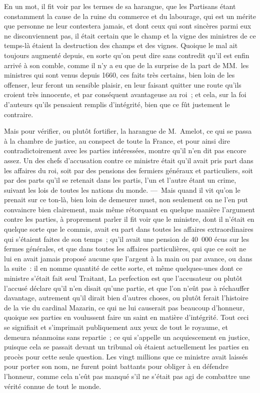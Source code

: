 \documentclass[french,twoside]{book} %
\begin{document}
En un mot, il fit voir par les termes de sa harangue, que les Partisans étant constamment la cause de la ruine du commerce et du labourage, qui est un mérite que personne ne leur contestera jamais, et dont ceux qui sont sincères parmi eux ne disconviennent pas, il était certain que le champ et la vigne des ministres de ce temps-là étaient la destruction des champs et des vignes. Quoique le mal ait toujours augmenté depuis, en sorte qu’on peut dire sans contredit qu’il est enfin arrivé à son comble, comme il n’y a eu que de la surprise de la part de MM. les ministres qui sont venus depuis 1660, ces faits très certains, bien loin de les offenser, leur feront un sensible plaisir, en leur faisant quitter une route qu’ils croient très innocente, et par conséquent avantageuse au roi ; et cela, sur la foi d’auteurs qu’ils pensaient remplis d’intégrité, bien que ce fût justement le contraire.\par
Mais pour vérifier, ou plutôt fortifier, la harangue de M. Amelot, ce qui se passa à la chambre de justice, au conspect de toute la France, et pour ainsi dire contradictoirement avec les parties intéressées, montre qu’il n’en dit pas encore assez. Un des chefs d’accusation contre ce ministre était qu’il avait pris part dans les affaires du roi, soit par des pensions des fermiers généraux et particuliers, soit par des parts qu’il se retenait dans les partis, l’un et l’autre étant un crime, suivant les lois de toutes les nations du monde. — Mais quand il vit qu’on le prenait sur ce ton-là, bien loin de demeurer muet, non seulement on ne l’en put convaincre bien clairement, mais même rétorquant en quelque manière l’argument contre les parties, à proprement parler il fit voir que le ministre, dont il n’était en quelque sorte que le commis, avait eu part dans toutes les affaires extraordinaires qui s’étaient faites de son temps ; qu’il avait une pension de 40 000 écus sur les fermes générales, et que dans toutes les affaires particulières, qui que ce soit ne lui en avait jamais proposé aucune que l’argent à la main ou par avance, ou dans la suite : il en nomme quantité de cette sorte, et même quelques-unes dont ce ministre s’était fait seul Traitant, La perfection est que l’accusateur ou plutôt l’accusé déclare qu’il n’en disait qu’une partie, et que l’on n’eût pas à réchauffer davantage, autrement qu’il dirait bien d’autres choses, ou plutôt ferait l’histoire de la vie du cardinal Mazarin, ce qui ne lui causerait pas beaucoup d’honneur, quoique ses parties en voulussent faire un saint en matière d’intégrité. Tout ceci se signifiait et s’imprimait publiquement aux yeux de tout le royaume, et demeura néanmoins sans repartie ; ce qui s’appelle un acquiescement en justice, puisque cela se passait devant un tribunal où étaient actuellement les parties en procès pour cette seule question. Les vingt millions que ce ministre avait laissés pour porter son nom, ne furent point battants pour obliger à en défendre l’honneur, comme cela n’eût pas manqué s’il ne s’était pas agi de combattre une vérité connue de tout le monde.\par
\end{document}
